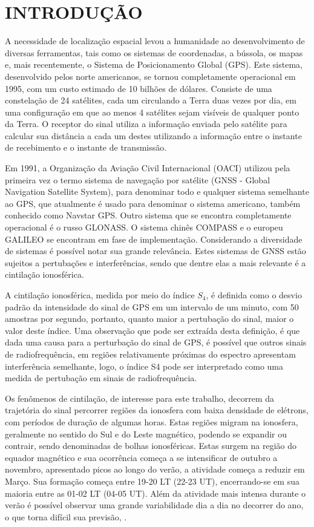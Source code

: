 \chapter{INTRODUÇÃO}

A necessidade de localização espacial levou a humanidade ao desenvolvimento de diversas ferramentas, tais como os sistemas de coordenadas, a bússola, os mapas e, mais recentemente, o Sistema de Posicionamento Global (GPS). Este sistema, desenvolvido pelos norte americanos, se tornou completamente operacional em 1995, com um custo estimado de 10 bilhões de dólares. Consiste de uma constelação de 24 satélites, cada um circulando a Terra duas vezes por dia, em uma configuração em que ao menos 4 satélites sejam visíveis de qualquer ponto da Terra. O receptor do sinal utiliza a informação enviada pelo satélite para calcular sua distância a cada um destes utilizando a informação entre o instante de recebimento e o instante de transmissão. 

Em 1991, a Organização da Aviação Civil Internacional (OACI) utilizou pela primeira vez o termo sistema de navegação por satélite (GNSS - Global Navigation Satellite System), para denominar todo e qualquer sistema semelhante ao GPS, que atualmente é usado para denominar o sistema americano, também conhecido como Navstar GPS. Outro sistema que se encontra completamente operacional é o russo GLONASS. O sistema chinês COMPASS e o europeu GALILEO se encontram em fase de implementação. Considerando a diversidade de sistemas é possível notar sua grande relevância. Estes sistemas de GNSS estão sujeitos a pertubações e interferências, sendo que dentre elas a mais relevante é a cintilação ionosférica.

A cintilação ionosférica, medida por meio do índice $S_4$, é definida como o desvio padrão da intensidade do sinal de GPS em um intervalo de um minuto, com 50 amostras por segundo, portanto, quanto maior a pertubação do sinal, maior o valor deste índice. Uma observação que pode ser extraída desta definição, é que dada uma causa para a perturbação do sinal de GPS, é possível que outros sinais de radiofrequência, em regiões relativamente próximas do espectro apresentam interferência semelhante, logo, o índice S4 pode ser interpretado como uma medida de pertubação em sinais de radiofrequência.

Os fenômenos de cintilação, de interesse para este trabalho, decorrem da trajetória do sinal percorrer regiões da ionosfera com baixa densidade de elétrons, com períodos de duração de algumas horas. Estas regiões migram na ionosfera, geralmente no sentido do Sul e do Leste magnético, podendo se expandir ou contrair, sendo denominadas de bolhas ionosféricas. Estas surgem na região do equador magnético e sua ocorrência começa a se intensificar de outubro a novembro, apresentado picos ao longo do verão, a atividade começa a reduzir em Março. Sua formação começa entre 19-20 LT (22-23 UT), encerrando-se em sua maioria entre as 01-02 LT (04-05 UT). Além da atividade mais intensa durante o verão é possível observar uma grande variabilidade dia a dia no decorrer do ano, o que torna difícil sua previsão, \cite{TAKAHASHI:2006}.

